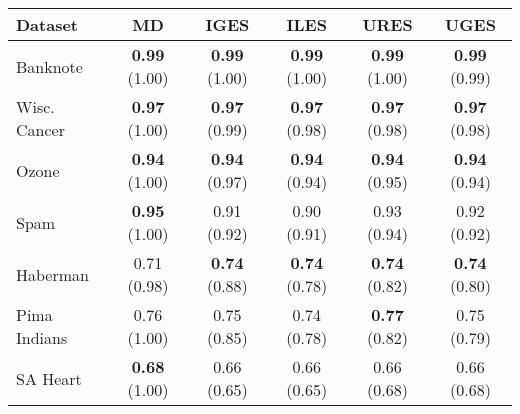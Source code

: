 \begin{tabular}{lccccc}
\toprule
Dataset & MD & IGES & ILES & URES & UGES \\
\midrule
Banknote & \textbf{0.99} (1.00) & \textbf{0.99} (1.00) & \textbf{0.99} (1.00) & \textbf{0.99} (1.00) & \textbf{0.99} (0.99) \\
Wisc. Cancer & \textbf{0.97} (1.00) & \textbf{0.97} (0.99) & \textbf{0.97} (0.98) & \textbf{0.97} (0.98) & \textbf{0.97} (0.98) \\
Ozone & \textbf{0.94} (1.00) & \textbf{0.94} (0.97) & \textbf{0.94} (0.94) & \textbf{0.94} (0.95) & \textbf{0.94} (0.94) \\
Spam & \textbf{0.95} (1.00) & 0.91 (0.92) & 0.90 (0.91) & 0.93 (0.94) & 0.92 (0.92) \\
Haberman & 0.71 (0.98) & \textbf{0.74} (0.88) & \textbf{0.74} (0.78) & \textbf{0.74} (0.82) & \textbf{0.74} (0.80) \\
Pima Indians & 0.76 (1.00) & 0.75 (0.85) & 0.74 (0.78) & \textbf{0.77} (0.82) & 0.75 (0.79) \\
SA Heart & \textbf{0.68} (1.00) & 0.66 (0.65) & 0.66 (0.65) & 0.66 (0.68) & 0.66 (0.68) \\
\bottomrule
\end{tabular}